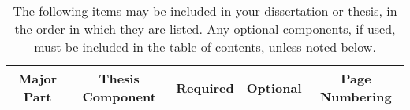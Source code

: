 \begin{table}
	\caption[%
        Required and Optional Thesis Components (NOTE: If you have a multi-lined table label/title,
        then the 2\textsuperscript{nd} and all additional lines should align with the first line, just like this one;
        also, be sure that no words display to the far right hand side where the page numbers for
        your tables display, just as shown in this example.)
    ]{The following items may be included in your dissertation or thesis, in the order in which they are listed.
  Any optional components, if used, \underline{must} be included in the table of contents, unless noted below.}
  \label{tab:include}
  \centering
  \DoubleSpacing

  \newcommand{\mycheckmark}{\checkmark}

  \footnotesize
  \begin{threeparttable}[b]
  \begin{tabular}{@{}ccccc@{}}
  \toprule
    \textbf{Major Part} &
    \textbf{Thesis Component} &
    \textbf{Required} &
    \textbf{Optional} &
    \textbf{Page Numbering} \\
  \midrule


\end{tabular}
\end{threeparttable}
\end{table}
